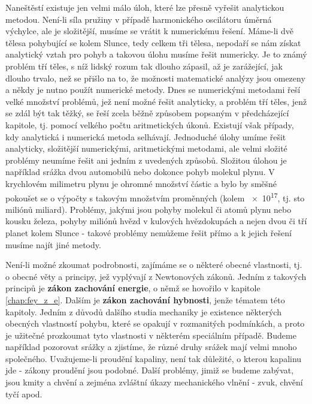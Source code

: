 {    Naneštěstí existuje jen velmi málo úloh, které lze přesně vyřešit analytickou metodou. Není-li 
    síla pružiny v případě harmonického oscilátoru úměrná výchylce, ale je složitější, musíme se 
    vrátit k numerickému řešení. Máme-li dvě tělesa pohybující se kolem Slunce, tedy celkem tři 
    tělesa, nepodaří se nám získat analytický vztah pro pohyb a takovou úlohu musíme řešit 
    numericky. Je to známý problém tří těles, s níž lidský rozum tak dlouho zápasil, až je 
    zarážející, jak dlouho trvalo, než se přišlo na to, že možnosti matematické analýzy jsou 
    omezeny a někdy je nutno použít numerické metody. Dnes se numerickými metodami řeší velké 
    množství problémů, jež není možné řešit analyticky, a problém tří těles, jenž se zdál být tak 
    těžký, se řeší zcela běžně způsobem popsaným v předcházející kapitole, tj. pomocí velkého počtu 
    aritmetických úkonů. Existují však případy, kdy analytická i numerická metoda selhávají. 
    Jednoduché úlohy umíme řešit analyticky, složitější numerickými, aritmetickými metodami, ale 
    velmi složité problémy neumíme řešit ani jedním z uvedených způsobů. Složitou úlohou je 
    například srážka dvou automobilů nebo dokonce pohyb molekul plynu. V krychlovém milimetru 
    plynu je ohromné množství částic a bylo by směšné pokoušet se o výpočty s takovým množstvím 
    proměnných (kolem \num{e17}, tj. sto miliónů miliard). Problémy, jakými jsou pohyby molekul či 
    atomů plynu nebo kousku železa, pohyby miliónů hvězd v kulových hvězdokupách a nejen dvou či 
    tří planet kolem Slunce - takové problémy nemůžeme řešit přímo a k jejich řešení musíme najít 
    jiné metody.
    
    Není-li možné zkoumat podrobnosti, zajímáme se o některé obecné vlastnosti, tj. o obecné věty 
    a principy, jež vyplývají z Newtonových zákonů. Jedním z takových principů je \textbf{zákon 
    zachování energie}, o němž se hovořilo v kapitole \ref{chap:fey_z_e}. Dalším je \textbf{zákon 
    zachování hybnosti}, jenže tématem této kapitoly. Jedním z důvodů dalšího studia mechaniky je 
    existence některých obecných vlastností pohybu, které se opakují v rozmanitých podmínkách, a 
    proto je užitečné prozkoumat tyto vlastnosti v některém speciálním případě. Budeme například 
    pozorovat srážky a zjistíme, že různé druhy srážek mají velmi mnoho společného. Uvažujeme-li 
    proudění kapaliny, není tak důležité, o kterou kapalinu jde - zákony proudění jsou podobné. 
    Další problémy, jimiž se budeme zabývat, jsou kmity a chvění a zejména zvláštní úkazy 
    mechanického vlnění - zvuk, chvění tyčí apod.
    
}
